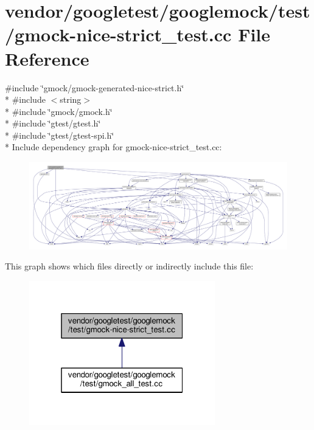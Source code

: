 \hypertarget{gmock-nice-strict__test_8cc}{}\section{vendor/googletest/googlemock/test/gmock-\/nice-\/strict\+\_\+test.cc File Reference}
\label{gmock-nice-strict__test_8cc}
{\ttfamily \#include \char`\"{}gmock/gmock-\/generated-\/nice-\/strict.\+h\char`\"{}}\\*
{\ttfamily \#include $<$string$>$}\\*
{\ttfamily \#include \char`\"{}gmock/gmock.\+h\char`\"{}}\\*
{\ttfamily \#include \char`\"{}gtest/gtest.\+h\char`\"{}}\\*
{\ttfamily \#include \char`\"{}gtest/gtest-\/spi.\+h\char`\"{}}\\*
Include dependency graph for gmock-\/nice-\/strict\+\_\+test.cc\+:\nopagebreak
\begin{figure}[H]
\begin{center}
\leavevmode
\includegraphics[width=350pt]{gmock-nice-strict__test_8cc__incl}
\end{center}
\end{figure}
This graph shows which files directly or indirectly include this file\+:\nopagebreak
\begin{figure}[H]
\begin{center}
\leavevmode
\includegraphics[width=229pt]{gmock-nice-strict__test_8cc__dep__incl}
\end{center}
\end{figure}
